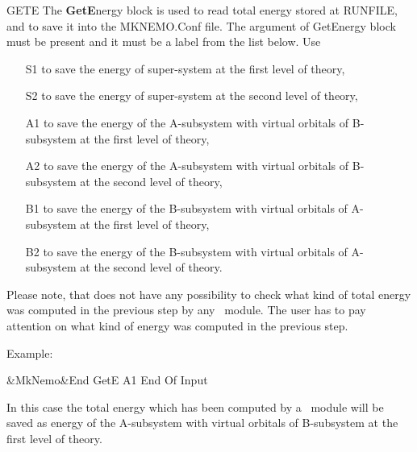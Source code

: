 \begin{keywordlist}
\item[GETE]
The {\bf GetE}nergy block is used to read total energy stored at RUNFILE, and to save it into the MKNEMO.Conf file. The argument of GetEnergy block must be present and it must be a label from the list below. Use
\begin{itemize}
\item[S1] to save the energy of super-system at the first level of theory,
\item[S2] to save the energy of super-system at the second level of theory,
\item[A1] to save the energy of the A-subsystem with virtual orbitals of B-subsystem at the first level of theory,
\item[A2] to save the energy of the A-subsystem with virtual orbitals of B-subsystem at the second level of theory,
\item[B1] to save the energy of the B-subsystem with virtual orbitals of A-subsystem at the first level of theory,
\item[B2] to save the energy of the B-subsystem with virtual orbitals of A-subsystem at the second level of theory.
\end{itemize}
Please note, that  does not have any possibility to check what kind of total energy was computed in the previous step by any \molcas\  module. The user has to pay attention on what kind of energy was computed in the previous step.


Example:
\begin{sourcelisting}
&MkNemo&End
  GetE
    A1
End Of Input
\end{sourcelisting}
In this case the total energy which has been computed by a \molcas\  module will be saved as energy of the A-subsystem with virtual orbitals of B-subsystem at the first level of theory.


\end{keywordlist}
